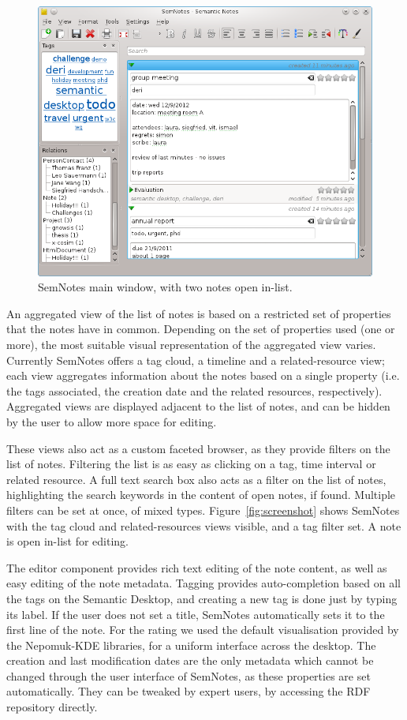 \begin{figure}[tb]
 \includegraphics[width=\linewidth]{chapters/core/img/semnotes-screenshot_2notes}
\caption{SemNotes main window, with two notes open in-list.}
\label{fig:screenshot2notes}
\end{figure} 

An aggregated view of the list of notes is based on a restricted set of properties that the notes have in common. Depending on the set of properties used (one or more), the most suitable visual representation of the aggregated view varies. Currently SemNotes offers a tag cloud, a timeline and a related-resource view; each view aggregates information about the notes based on a single property (i.e. the tags associated, the creation date and the related resources, respectively). Aggregated views are displayed adjacent to the list of notes, and can be hidden by the user to allow more space for editing. 

These views also act as a custom faceted browser, as they provide filters on the list of notes. Filtering the list is as easy as clicking on a tag, time interval or related resource. A full text search box also acts as a filter on the list of notes, highlighting the search keywords in the content of open notes, if found. Multiple filters can be set at once, of mixed types. Figure~\ref{fig:screenshot} shows SemNotes with the tag cloud and related-resources views visible, and a tag filter set. A note is open in-list for editing. 

The editor component provides rich text editing of the note content, as well as easy editing of the note metadata. Tagging provides auto-completion based on all the tags on the Semantic Desktop, and creating a new tag is done just by typing its label. If the user does not set a title, SemNotes automatically sets it to the first line of the note. For the rating we used the default visualisation provided by the Nepomuk-KDE libraries, for a uniform interface across the desktop. The creation and last modification dates are the only metadata which cannot be changed through the user interface of SemNotes, as these properties are set automatically. They can be tweaked by expert users, by accessing the RDF repository directly. 

